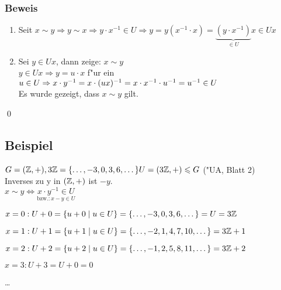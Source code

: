 {\begin{enumerate}
		\subsubsection*{Beweis}
		\begin{enumerate}
			\item
			Seit $x \sim y \Rightarrow y \sim x \Rightarrow y \cdot x^{-1} \in U \Rightarrow y=y(x^{-1} \cdot x) = \underbrace{(y \cdot x^{-1})}_{\in U}x \in Ux$
			\item
			Sei $y \in Ux$, dann zeige: $x \sim y$ \\
			$y \in Ux \Rightarrow y = u \cdot x$ f"ur ein $u \in U\\
			\Rightarrow x \cdot y^{-1} = x \cdot (ux)^{-1} = x \cdot x^{-1} \cdot u^{-1} = u^{-1} \in U$\\
			Es wurde gezeigt, dass $x \sim y$ gilt.
		\end{enumerate} \qed

\end{enumerate}}

\subsection{Beispiel}

$G = (\mathbb{Z}, +), 3 \mathbb{Z} = \{\dots, -3,0,3,6,\dots\}\\
U = (3 \mathbb{Z}, +) \leqslant G$ ("UA, Blatt 2)\\
Inverses zu y in $(\mathbb{Z},+)$ ist $-y$.\\
$x \sim y \Leftrightarrow \underset{\text{bzw.:}\, x-y \in U}{x \cdot y ^{-1} \in U}$ 


$ x=0 : U+0 = \{u+0 \;|\; u \in U\}= \{\dots, -3,0,3,6,\dots\} = U = 3\mathbb{Z}$
   
$x=1 : U+1 = \{u+1 \;|\; u \in U\} = \{\dots, -2, 1, 4, 7, 10, \dots \} = 3\mathbb{Z} +1$

$x=2 : U+2 = \left\{u + 2 \;|\; u \in U\right\} = \left\{\dots, -1, 2, 5, 8, 11, \dots\right\} = 3 \mathbb{Z} + 2$

$x=3: U+3 = U+0 = 0$

\dots
   
   
   
   
   
   
   
   
   
   
   
   
   
   
   
   
   